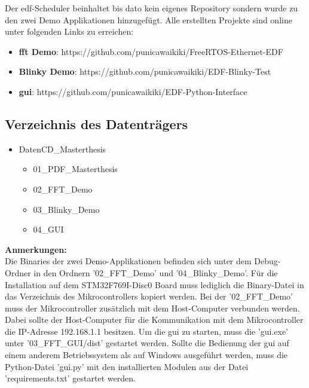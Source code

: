 \documentclass[../EDF Master Thesis.tex]{subfiles}
\begin{document}
Der \ac{edf}-Scheduler beinhaltet bis dato kein eigenes Repository sondern wurde zu den zwei Demo Applikationen hinzugefügt.
Alle erstellten Projekte sind online unter folgenden Links zu erreichen:

\begin{itemize}
    \item \textbf{\ac{fft} Demo}: https://github.com/punicawaikiki/FreeRTOS-Ethernet-EDF
    \item \textbf{Blinky Demo}: https://github.com/punicawaikiki/EDF-Blinky-Test
    \item \textbf{\ac{gui}}: https://github.com/punicawaikiki/EDF-Python-Interface
\end{itemize}

\subsection{Verzeichnis des Datenträgers}

\begin{itemize}
    \item Daten\-CD\_Masterthesis
    \begin{itemize}
        \item 01\_PDF\_Masterthesis
        \item 02\_FFT\_Demo
        \item 03\_Blinky\_Demo
        \item 04\_GUI
    \end{itemize}
\end{itemize}

\textbf{Anmerkungen:}\\
Die Binaries der zwei Demo-Applikationen befinden sich unter dem Debug-Ordner in den Ordnern '02\_FFT\_Demo' und '04\_Blinky\_Demo'.
Für die Installation auf dem STM32F769I-Disc0 Board muss lediglich die Binary-Datei in das Verzeichnis des Mikrocontrollers kopiert werden.
Bei der '02\_FFT\_Demo' muss der Mikrocontroller zusätzlich mit dem Host-Computer verbunden werden.
Dabei sollte der Host-Computer für die Kommunikation mit dem Mikrocontroller die IP-Adresse 192.168.1.1 besitzen.
Um die \ac{gui} zu starten, muss die 'gui.exe' unter '03\_FFT\_GUI/dist' gestartet werden.
Sollte die Bedienung der \ac{gui} auf einem anderem Betriebssystem als auf Windows ausgeführt werden, muss die Python-Datei 'gui.py' mit den installierten Modulen aus der Datei 'requirements.txt' gestartet werden.
\end{document}
